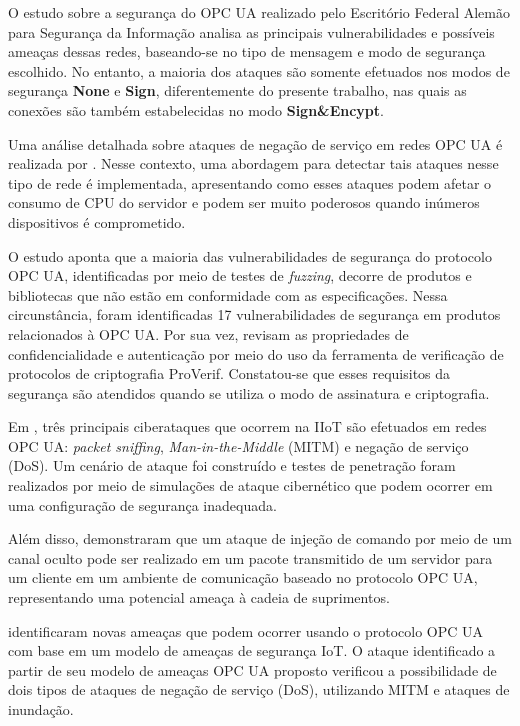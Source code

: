     O estudo sobre a segurança do OPC UA realizado pelo Escritório Federal Alemão para Segurança da Informação \cite{bsi2017} analisa as principais vulnerabilidades e possíveis ameaças dessas redes, baseando-se no tipo de mensagem e modo de segurança escolhido. No entanto, a maioria dos ataques são somente efetuados nos modos de segurança \textbf{None} e \textbf{Sign}, diferentemente do presente trabalho, nas quais as conexões são também estabelecidas no modo \textbf{Sign\&Encypt}.

    Uma análise detalhada sobre ataques de negação de serviço em redes OPC UA é realizada por . Nesse contexto, uma abordagem para detectar tais ataques nesse tipo de rede é implementada, apresentando como esses ataques podem afetar o consumo de CPU do servidor e podem ser muito poderosos quando inúmeros dispositivos é comprometido.

    O estudo \cite{kaspersky2018} aponta que a maioria das vulnerabilidades de segurança do protocolo OPC UA, identificadas por meio de testes de \textit{fuzzing}, decorre de produtos e bibliotecas que não estão em conformidade com as especificações. Nessa circunstância, foram identificadas 17 vulnerabilidades de segurança em produtos relacionados à OPC UA. Por sua vez,  revisam as propriedades de confidencialidade e autenticação por meio do uso da ferramenta de verificação de protocolos de criptografia ProVerif. Constatou-se que esses requisitos da segurança são atendidos quando se utiliza o modo de assinatura e criptografia.

    Em \cite{varadarajan2022}, três principais ciberataques que ocorrem na IIoT são efetuados em redes OPC UA: \textit{packet sniffing}, \textit{Man-in-the-Middle} (MITM) e negação de serviço (DoS). Um cenário de ataque foi construído e testes de penetração foram realizados por meio de simulações de ataque cibernético que podem ocorrer em uma configuração de segurança inadequada.

    Além disso,  demonstraram que um ataque de injeção de comando por meio de um canal oculto pode ser realizado em um pacote transmitido de um servidor para um cliente em um ambiente de comunicação baseado no protocolo OPC UA, representando uma potencial ameaça à cadeia de suprimentos.
    
     identificaram novas ameaças que podem ocorrer usando o protocolo OPC UA com base em um modelo de ameaças de segurança IoT. O ataque identificado a partir de seu modelo de ameaças OPC UA proposto verificou a possibilidade de dois tipos de ataques de negação de serviço (DoS), utilizando MITM e ataques de inundação.

